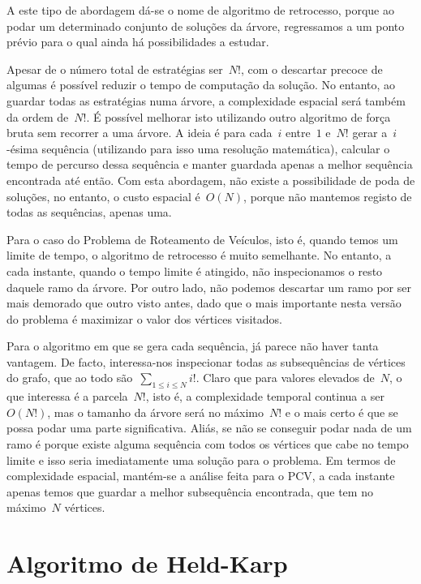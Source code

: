 \documentclass[12pt,a4paper,reqno]{report}
\numberwithin{figure}{section}
\numberwithin{equation}{section}
\numberwithin{figure}{section}
\numberwithin{equation}{section}
\begin{document}
A este tipo de abordagem dá-se o nome de algoritmo de retrocesso, porque ao podar um determinado conjunto de soluções da árvore, regressamos a um ponto prévio para o qual ainda há possibilidades a estudar.

Apesar de o número total de estratégias ser~$N!$, com o descartar precoce de algumas é possível reduzir o tempo de computação da solução. No entanto, ao guardar todas as estratégias numa árvore, a complexidade espacial será também da ordem de~$N!$. É possível melhorar isto utilizando outro algoritmo de força bruta sem recorrer a uma árvore. A ideia é para cada~$i$ entre~$1$ e~$N!$ gerar a~$i$-ésima sequência (utilizando para isso uma resolução matemática), calcular o tempo de percurso dessa sequência e manter guardada apenas a melhor sequência encontrada até então. Com esta abordagem, não existe a possibilidade de poda de soluções, no entanto, o custo espacial é~$O(N)$, porque não mantemos registo de todas as sequências, apenas uma.

Para o caso do Problema de Roteamento de Veículos, isto é, quando temos um limite de tempo, o algoritmo de retrocesso é muito semelhante. No entanto, a cada instante, quando o tempo limite é atingido, não inspecionamos o resto daquele ramo da árvore. Por outro lado, não podemos descartar um ramo por ser mais demorado que outro visto antes, dado que o mais importante nesta versão do problema é maximizar o valor dos vértices visitados.

Para o algoritmo em que se gera cada sequência, já parece não haver tanta vantagem. De facto, interessa-nos inspecionar todas as subsequências de vértices do grafo, que ao todo são~$\sum_{1 \leq i \leq N} i!$. Claro que para valores elevados de~$N$, o que interessa é a parcela~$N!$, isto é, a complexidade temporal continua a ser~$O(N!)$, mas o tamanho da árvore será no máximo~$N!$ e o mais certo é que se possa podar uma parte significativa. Aliás, se não se conseguir podar nada de um ramo é porque existe alguma sequência com todos os vértices que cabe no tempo limite e isso seria imediatamente uma solução para o problema. Em termos de complexidade espacial, mantém-se a análise feita para o PCV, a cada instante apenas temos que guardar a melhor subsequência encontrada, que tem no máximo~$N$ vértices.

\section{Algoritmo de Held-Karp}
\end{document}
